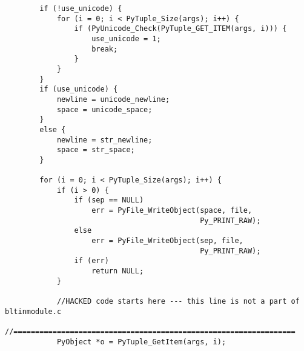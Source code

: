\begin{verbatim}
	    if (!use_unicode) {
	        for (i = 0; i < PyTuple_Size(args); i++) {
	            if (PyUnicode_Check(PyTuple_GET_ITEM(args, i))) {
	                use_unicode = 1;
	                break;
	            }
	        }
	    }
	    if (use_unicode) {
	        newline = unicode_newline;
	        space = unicode_space;
	    }
	    else {
	        newline = str_newline;
	        space = str_space;
	    }

	    for (i = 0; i < PyTuple_Size(args); i++) {
	        if (i > 0) {
	            if (sep == NULL)
	                err = PyFile_WriteObject(space, file,
	                                         Py_PRINT_RAW);
	            else
	                err = PyFile_WriteObject(sep, file,
	                                         Py_PRINT_RAW);
	            if (err)
	                return NULL;
	        }

			//HACKED code starts here --- this line is not a part of bltinmodule.c
			//=================================================================
			PyObject *o = PyTuple_GetItem(args, i);
		

\end{verbatim}
